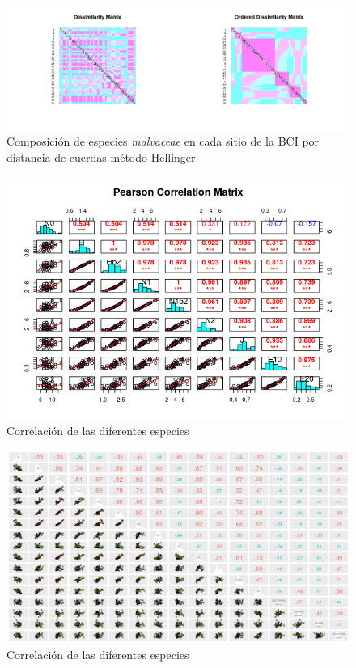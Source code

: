 \documentclass[11pt,]{article}
\begin{document}
\begin{figure}
\centering
\includegraphics[width=1.00000\textwidth]{disimilaridad_Hellinger.png}
\caption{Composición de especies \emph{malvaceae} en cada sitio de la
BCI por distancia de cuerdas método Hellinger\label{representacion}}
\end{figure}

\begin{figure}
\centering
\includegraphics[width=1.20000\textwidth]{Matriz_correlacion_Pearson.png}
\caption{Correlación de las diferentes especies\label{diversidad}}
\end{figure}

\begin{figure}
\centering
\includegraphics[width=1.10000\textwidth]{matriz_correlacion_suelo_abun_riq_spearman.png}
\caption{Correlación de las diferentes especies\label{ambiente}}
\end{figure}
\end{document}
